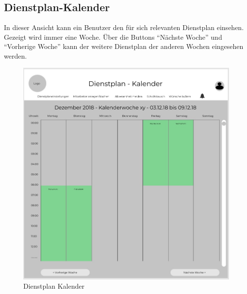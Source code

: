 \documentclass[11pt,
paper=a4,
bibtotocnumbered,	  %
liststotocnumbered,  %
DIV=calc,		  %
tablecaptionabove,	  %
headinclude,
]{article}
\begin{document}
\subsection{Dienstplan-Kalender}
In dieser Ansicht kann ein Benutzer den für sich relevanten Dienstplan einsehen. Gezeigt wird immer eine Woche. Über die Buttons “Nächste Woche” und “Vorherige Woche” kann der weitere Dienstplan der anderen Wochen eingesehen werden.
\begin{figure}[H]
\includegraphics[width=1\textwidth]{Bilder/Dienstplan-Kalender.jpg}
\caption{Dienstplan Kalender}
\end{figure}
\end{document}
